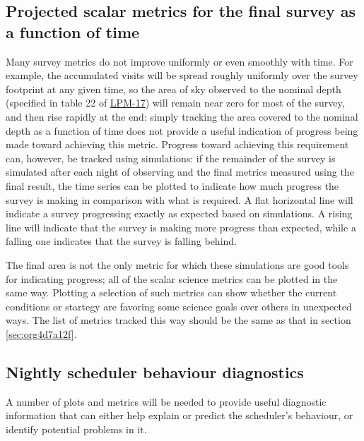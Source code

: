 \subsection{Projected scalar metrics for the final survey as a function of time}
\label{sec:org5ad4b29}
Many survey metrics do not improve uniformly or even smoothly with time.
For example, the accumulated visits will be spread roughly uniformly over the survey footprint at any given time, so the area of sky observed to the nominal depth (specified in table 22 of \href{http://ls.st/lpm-17}{LPM-17}) will remain near zero for most of the survey, and then rise rapidly at the end: simply tracking the area covered to the nominal depth as a function of time does not provide a useful indication of progress being made toward achieving this metric.
Progress toward achieving this requirement can, however, be tracked using simulations: if the remainder of the survey is simulated after each night of observing and the final metrics measured using the final result, the time series can be plotted to indicate how much progress the survey is making in comparison with what is required.
A flat horizontal line will indicate a survey progressing exactly as expected based on simulations.
A rising line will indicate that the survey is making more progress than expected, while a falling one indicates that the survey is falling behind.

The final area is not the only metric for which these simulations are good tools for indicating progress; all of the scalar science metrics can be plotted in the same way. Plotting a selection of such metrics can show whether the current conditions or startegy are favoring some science goals over others in unexpected ways.
The list of metrics tracked this way should be the same as that in section \ref{sec:org4d7a12f}.

\subsection{Nightly scheduler behaviour diagnostics}
\label{sec:org6b37089}
A number of plots and metrics will be needed to provide useful diagnostic information that can either help explain or predict the scheduler's behaviour, or identify potential problems in it.

